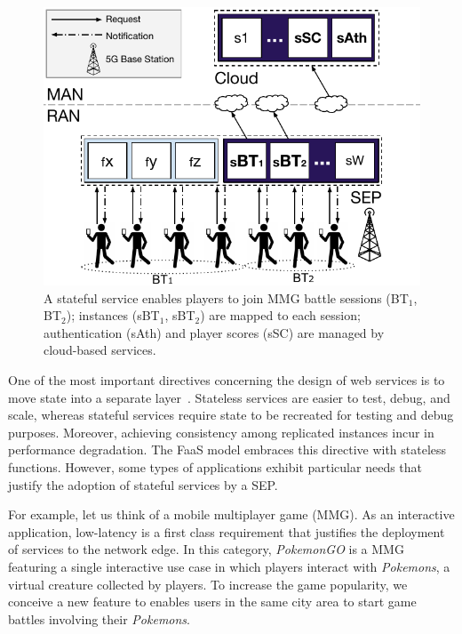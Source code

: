 \begin{figure}[bp]
	\centering
	\includegraphics[width=1\linewidth]{Figs/Stateful_Edge_Services_MMG.pdf}
	\caption{A stateful service enables players to join MMG battle sessions (BT$_1$, BT$_2$); instances (sBT$_1$, sBT$_2$) are mapped to each session; authentication (sAth) and player scores (sSC) are managed by cloud-based services.}
	\label{fig:Steteful_Edge_MMG}
\end{figure}

One of the most important directives concerning the design of web services is to move state into a separate layer~\cite{Armbrust:2010}. Stateless services are easier to test, debug, and scale, whereas stateful services require state to be recreated for testing and debug purposes. Moreover, achieving consistency among replicated instances incur in performance degradation. 
The FaaS model embraces this directive with stateless functions.
However, some types of applications exhibit particular needs that justify the adoption of stateful services by a SEP.

For example, let us think of a mobile multiplayer game (MMG). As an interactive application, low-latency is a first class requirement that justifies the deployment of services to the network edge. In this category, \textit{PokemonGO} is 
a MMG featuring a single interactive use case in which players interact with \textit{Pokemons}, a virtual creature collected by players.
To increase the game popularity, we conceive a new feature to enables users in the same city area to start game battles involving their \textit{Pokemons}. 

